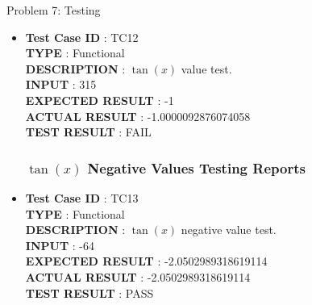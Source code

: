 \documentclass[a4paper,12pt]{article}
\begin{document}
\begin{section}{Problem 7: Testing}
\begin{itemize}
\item \textbf{Test Case ID} \hspace{1.85cm} : TC12  \\
\textbf{TYPE } \hspace{3.05cm}  : Functional\\
\textbf{DESCRIPTION }\hspace{1.15cm} : $\tan(x)$ value test. \\
\textbf{INPUT} \hspace{3.05cm} :  315 \\
\textbf{EXPECTED RESULT} \hspace{0.01cm} : -1 \\
\textbf{ACTUAL RESULT} \hspace{0.6cm} : -1.0000092876074058 \\
\textbf{TEST RESULT} \hspace{1.45cm} : FAIL \\



\subsubsection{$\tan(x)$ Negative Values Testing Reports}

\item \textbf{Test Case ID} \hspace{1.85cm} : TC13  \\
\textbf{TYPE } \hspace{3.05cm}  : Functional\\
\textbf{DESCRIPTION }\hspace{1.15cm} : $\tan(x)$ negative value test. \\
\textbf{INPUT} \hspace{3.05cm} :  -64 \\
\textbf{EXPECTED RESULT} \hspace{0.01cm} : -2.0502989318619114  \\
\textbf{ACTUAL RESULT} \hspace{0.6cm} : -2.0502989318619114  \\
\textbf{TEST RESULT} \hspace{1.45cm} : PASS \\


\end{itemize}
\end{section}
\end{document}

